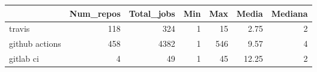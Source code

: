 \begin{tabular}{lrrrrrr}
\toprule
{} &  Num\_repos &  Total\_jobs &  Min &  Max &  Media &  Mediana \\
\midrule
travis         &        118 &         324 &    1 &   15 &   2.75 &        2 \\
github actions &        458 &        4382 &    1 &  546 &   9.57 &        4 \\
gitlab ci      &          4 &          49 &    1 &   45 &  12.25 &        2 \\
\bottomrule
\end{tabular}
